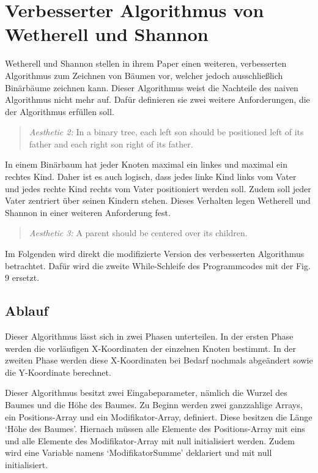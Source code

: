 
\section{Verbesserter Algorithmus von Wetherell und Shannon}
\label{chap:kapitel3_2}
Wetherell und Shannon stellen in ihrem Paper einen weiteren, verbesserten Algorithmus zum Zeichnen von Bäumen vor, welcher jedoch
ausschließlich Binärbäume zeichnen kann. Dieser Algorithmus weist die Nachteile des naiven Algorithmus nicht mehr auf.
Dafür definieren sie zwei weitere Anforderungen, die der Algorithmus erfüllen soll.   

\begin{quotation}
	\textit{Aesthetic 2:} In a binary tree, each left son should be positioned
	left of its father and each right son right of its father.\cite[]{q1}
\end{quotation}

In einem Binärbaum hat jeder Knoten maximal ein linkes und maximal ein rechtes Kind. Daher ist es auch logisch, dass jedes linke Kind 
links vom Vater und jedes rechte Kind rechts vom Vater positioniert werden soll. Zudem soll jeder Vater zentriert über seinen Kindern
stehen. Dieses Verhalten legen Wetherell und Shannon in einer weiteren Anforderung fest.

\begin{quotation}
	\textit{Aesthetic 3:} A parent should be centered over its children.\cite[]{q1}
\end{quotation}

Im Folgenden wird direkt die modifizierte Version des verbesserten Algorithmus betrachtet. Dafür wird die zweite While-Schleife des Programmcodes
mit der Fig. 9 \cite[A modification of Algorithm 3]{q1} ersetzt.

\label{chap:kapitel3_2_Ablauf}
\subsection{Ablauf}

Dieser Algorithmus lässt sich in zwei Phasen unterteilen. In der ersten Phase werden die vorläufigen X-Koordinaten der einzelnen Knoten bestimmt.
In der zweiten Phase werden diese X-Koordinaten bei Bedarf nochmals abgeändert sowie die Y-Koordinate berechnet.

Dieser Algorithmus besitzt zwei Eingabeparameter, nämlich die Wurzel des Baumes und die Höhe des Baumes. Zu Beginn werden zwei
ganzzahlige Arrays, ein Positions-Array und ein Modifikator-Array, definiert. Diese besitzen die Länge ‘Höhe des Baumes’.
Hiernach müssen alle Elemente des Positions-Array mit eins und alle Elemente des Modifikator-Array mit null initialisiert werden.
Zudem wird eine Variable namens ‘ModifikatorSumme’ deklariert und mit null initialisiert.

